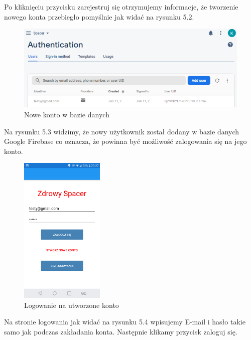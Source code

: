 Po kliknięciu przycisku zarejestruj się otrzymujemy informacje, że tworzenie nowego konta przebiegło pomyślnie jak widać na rysunku 5.2.

\begin{figure}[!htb]
	\begin{center}
		\includegraphics[width=12cm]{rys/ZZauth.png}
		\caption{Nowe konto w bazie danych}
		\label{rys:rysunek031}
	\end{center}
\end{figure}

Na rysunku 5.3 widzimy, że nowy użytkownik został dodany w bazie danych Google Firebase co oznacza, że powinna być możliwość zalogowania się na jego konto.

\begin{figure}[!htb]
	\begin{center}
		\includegraphics[width=4cm]{rys/ZZlog.png}
		\caption{Logowanie na utworzone konto}
		\label{rys:rysunek032}
	\end{center}
\end{figure}

Na stronie logowania jak widać na rysunku 5.4 wpisujemy E-mail i hasło takie samo jak podczas zakładania konta. Następnie klikamy przycisk zaloguj się.


